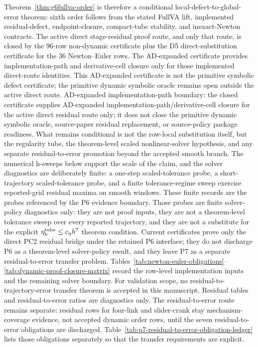 \documentclass[preprint,12pt]{elsarticle}
\begin{document}
Theorem~\ref{thm:g6fullva-order} is therefore a conditional
local-defect-to-global-error theorem: sixth order follows from the stated FullVA lift,
implemented residual-defect, endpoint-closure, compact-tube stability, and
inexact-Newton contracts. The active direct stage-residual proof route, and
only that route, is closed by the 96-row non-dynamic certificate plus the D5
direct-substitution certificate for the 36 Newton--Euler rows. The
AD-expanded certificate provides implementation-path and derivative-cell
closure only for those implemented direct-route identities. This AD-expanded
certificate is not the primitive symbolic defect certificate; the primitive
dynamic symbolic oracle remains open outside the active direct route. AD-expanded
implementation-path boundary: the closed certificate supplies AD-expanded
implementation-path/derivative-cell closure for the active direct residual
route only; it does not close the primitive dynamic symbolic oracle,
source-paper residual replacement, or source-policy package readiness. What
remains conditional is not the row-local substitution itself, but the
regularity tube, the theorem-level scaled nonlinear-solver hypothesis, and any
separate residual-to-error promotion beyond the accepted smooth branch. The
numerical h-sweeps below support the scale of the claim, and the solver
diagnostics are deliberately finite: a one-step scaled-tolerance probe, a
short-trajectory scaled-tolerance probe, and a finite tolerance-regime sweep
exercise reported-grid residual maxima on smooth windows. These finite
records are the probes referenced by the P6 evidence boundary. Those probes are
finite solver-policy diagnostics only: they are not proof inputs, they are not a
theorem-level tolerance sweep over every reported trajectory, and they are not
a substitute for the explicit \(\eta_h^{\rm tube}\le c_\eta h^7\) theorem
condition.
Current certificates prove only the direct PC2 residual bridge under the retained
P6 interface; they do not discharge P6 as a theorem-level solver-policy result,
and they leave P7 as a separate residual-to-error transfer problem.
Tables~\ref{tab:newton-euler-obligations}--\ref{tab:dynamic-proof-closure-matrix}
record the row-level implementation inputs and the remaining solver
boundary. For validation scope, no residual-to-trajectory-error transfer
theorem is accepted in this manuscript.
Residual tables and residual-to-error ratios are diagnostics only.
The residual-to-error route remains separate: residual rows
for four-link and slider-crank stay mechanism-coverage evidence, not accepted
dynamic order rows, until the seven residual-to-error obligations are
discharged.
Table~\ref{tab:p7-residual-to-error-obligation-ledger} lists those
obligations separately so that the transfer requirements are explicit.
\end{document}

